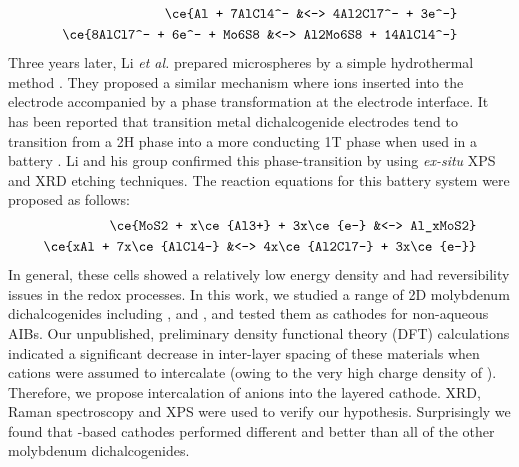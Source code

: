 \begin{align*}
          \ce{Al + 7AlCl4^- &<-> 4Al2Cl7^- + 3e^-}\\
\ce{8AlCl7^- + 6e^- + Mo6S8 &<-> Al2Mo6S8 + 14AlCl4^-}
\end{align*}
Three years later, Li \textit{et al.} prepared  microspheres by a simple hydrothermal method \cite{li_rechargeable_2018}. They proposed a similar mechanism where  ions inserted into the electrode accompanied by a phase transformation at the electrode interface. It has been reported that transition metal dichalcogenide electrodes tend to transition from a 2H phase into a more conducting 1T phase when used in a battery \cite{fan_hybrid_2017}. Li and his group confirmed this phase-transition by using \textit{ex-situ} XPS and XRD etching techniques. The reaction equations for this battery system were proposed as follows:
\begin{align*}
    \ce{MoS2 + x\ce{Al3+}  + 3x\ce{e-} &<-> Al_xMoS2}\\
    \ce{xAl + 7x\ce{AlCl4-} &<-> 4x\ce{Al2Cl7-} + 3x\ce{e-}}
\end{align*}
In general, these cells showed a relatively low energy density and had reversibility issues in the redox processes.
In this work, we studied a range of 2D molybdenum dichalcogenides including ,  and , and tested them as cathodes for non-aqueous AIBs. Our unpublished, preliminary density functional theory (DFT) calculations indicated a significant decrease in inter-layer spacing of these materials when  cations were assumed to intercalate (owing to the very high charge density of ). Therefore, we propose intercalation of  anions into the layered cathode. XRD, Raman spectroscopy and XPS were used to verify our hypothesis. Surprisingly we found that -based cathodes performed different and better than all of the other molybdenum dichalcogenides.

